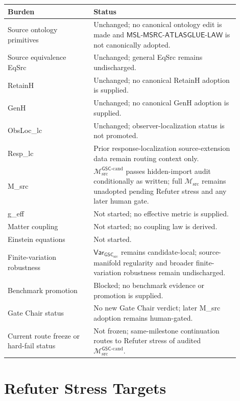 \documentclass[11pt]{article}
\newcommand{\Msrc}{\mathcal{M}_{\mathrm{src}}}
\newcommand{\Mgsccand}{\mathcal{M}_{\mathrm{src}}^{\mathsf{GSC}\text{-}\mathrm{cand}}}
\newcommand{\GSC}{\mathsf{GSC}_{\mathrm{src}}}
\newcommand{\Vargsc}{\mathsf{Var}_{\GSC}}
\newcommand{\MSL}{\mathsf{MSL}\mbox{-}\mathsf{MSRC}\mbox{-}\mathsf{ATLASGLUE}\mbox{-}\mathsf{LAW}}
\begin{document}
\begin{center}
\begin{tabular}{p{0.33\linewidth}p{0.57\linewidth}}
\hline
Burden & Status \\
\hline
Source ontology primitives & Unchanged; no canonical ontology edit is made and \(\MSL\) is not canonically adopted. \\
Source equivalence EqSrc & Unchanged; general EqSrc remains undischarged. \\
RetainH & Unchanged; no canonical RetainH adoption is supplied. \\
GenH & Unchanged; no canonical GenH adoption is supplied. \\
ObsLoc\_lc & Unchanged; observer-localization status is not promoted. \\
Resp\_lc & Prior response-localization source-extension data remain routing context only. \\
M\_src & \(\Mgsccand\) passes hidden-import audit conditionally as written; full \(\Msrc\) remains unadopted pending Refuter stress and any later human gate. \\
g\_eff & Not started; no effective metric is supplied. \\
Matter coupling & Not started; no coupling law is derived. \\
Einstein equations & Not started. \\
Finite-variation robustness & \(\Vargsc\) remains candidate-local; source-manifold regularity and broader finite-variation robustness remain undischarged. \\
Benchmark promotion & Blocked; no benchmark evidence or promotion is supplied. \\
Gate Chair status & No new Gate Chair verdict; later M\_src adoption remains human-gated. \\
Current route freeze or hard-fail status & Not frozen; same-milestone continuation routes to Refuter stress of audited \(\Mgsccand\). \\
\hline
\end{tabular}
\end{center}

\section{Refuter Stress Targets}
\end{document}
